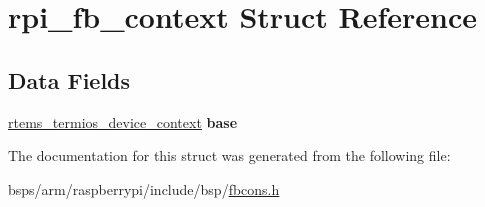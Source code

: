 \hypertarget{structrpi__fb__context}{}\section{rpi\+\_\+fb\+\_\+context Struct Reference}
\label{structrpi__fb__context}
\subsection*{Data Fields}
\begin{DoxyCompactItemize}
\item 
\mbox{\label{structrpi__fb__context_a5e2e5025667b6e1441b3a4d83dcb54d2}} 
\mbox{\hyperlink{structrtems__termios__device__context}{rtems\+\_\+termios\+\_\+device\+\_\+context}} {\bfseries base}
\end{DoxyCompactItemize}


The documentation for this struct was generated from the following file\+:\begin{DoxyCompactItemize}
\item 
bsps/arm/raspberrypi/include/bsp/\mbox{\hyperlink{fbcons_8h}{fbcons.\+h}}\end{DoxyCompactItemize}
